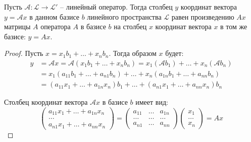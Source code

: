 \begin{theorem}
  \label{th:33}
  Пусть $\mathcal{A} : \mathcal{L} \to \mathcal{L}'$ -- линейный оператор. Тогда столбец $y$ координат вектора $y = \mathcal{A}x$ в данном базисе $b$ линейного пространства $\mathcal{L}$ равен произведению $Ax$ матрицы $A$ оператора $A$ в базисе $b$ на столбец $x$ координат вектора $x$ в том же базисе:  $y = Ax$.
\end{theorem}
\begin{proof}
  Пусть $x = x_1 b_1 + \ldots + x_n b_n$. Тогда образом $x$ будет:
  \begin{align*}
    y &= \mathcal{A} x = \mathcal{A} (x_1 b_1 + \ldots + x_n b_n) = x_1 (\mathcal{A}b_1) + \ldots + x_n (\mathcal{A} b_n) \\
      &= x_1 \left( a_{11} b_1 + \ldots + a_{n1} b_n \right) + \ldots + x_n \left( a_{1n} b_1 + \ldots + a_{nn} b_n \right) \\
      &= \left( a_{11} x_1 + \ldots + a_{1n} x_n \right) b_1 + \ldots + \left( a_{n1} x_1 + \ldots + a_{nn} x_n \right) b_n
  \end{align*}

Столбец координат вектора $\mathcal{A}x$ в базисе $b$ имеет вид:  \[
\begin{pmatrix}
  a_{11} x_1 + \ldots + a_{1n} x_{n} \\
  \ldots \\
  a_{n1} x_1 + \ldots + a_{nn} x_{n}
\end{pmatrix}
=
\begin{pmatrix}
  a_{11} & \ldots & a_{1n} \\
  \ldots & \ldots & \ldots \\
  a_{n1} & \ldots & a_{nn}
\end{pmatrix}
\begin{pmatrix}
  x_1 \\
  \ldots \\
  x_{n}
\end{pmatrix}
= Ax
\] 
\end{proof}

